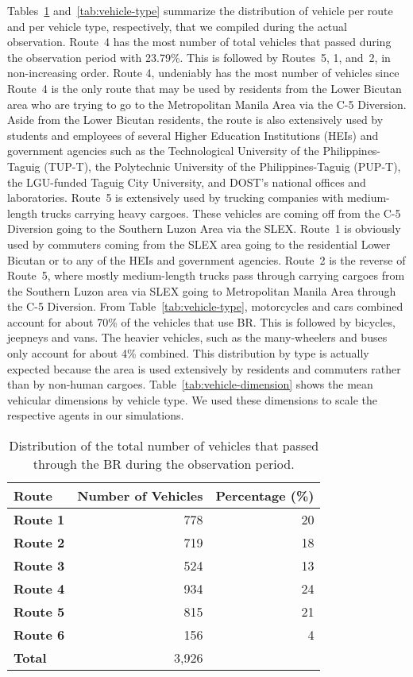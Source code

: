 \documentclass[preprint]{./acm_proc_article-sp}
\begin{document}
Tables~\ref{tab:current} and~\ref{tab:vehicle-type} summarize the distribution of vehicle per route and per vehicle type, respectively, that we compiled during the actual observation. Route~4 has the most number of total vehicles that passed during the observation period with 23.79\%. This is followed by Routes~5, 1, and~2, in non-increasing order. Route 4, undeniably has the most number of vehicles since Route~4 is the only route that may be used by residents from the Lower Bicutan area who are trying to go to the Metropolitan Manila Area via the C-5 Diversion. Aside from the Lower Bicutan residents, the route is also extensively used by students and employees of several Higher Education Institutions (HEIs) and government agencies such as the Technological University of the Philippines-Taguig (TUP-T), the Polytechnic University of the Philippines-Taguig (PUP-T), the LGU-funded Taguig City University, and DOST's national offices and laboratories. Route~5 is extensively used by trucking companies with medium-length trucks carrying heavy cargoes. These vehicles are coming off from the C-5 Diversion going to the Southern Luzon Area via the SLEX. Route~1 is obviously used by commuters coming from the SLEX area going to the residential Lower Bicutan or to any of the HEIs and government agencies. Route~2 is the reverse of Route~5, where mostly medium-length trucks pass through carrying cargoes from the Southern Luzon area via SLEX going to Metropolitan Manila Area through the C-5 Diversion. From Table~\ref{tab:vehicle-type}, motorcycles and cars combined account for about 70\% of the vehicles that use BR. This is followed by bicycles, jeepneys and vans. The heavier vehicles, such as the many-wheelers and buses only account for about 4\% combined. This distribution by type is actually expected because the area is used extensively by residents and commuters rather than by non-human cargoes. Table~\ref{tab:vehicle-dimension} shows the mean vehicular dimensions by vehicle type. We used these dimensions to scale the respective agents in our simulations.

\begin{table}[bth]
\caption{Distribution of the total number of vehicles that passed through the BR during the observation period.}\label{tab:current}
\centering\begin{tabular}{lrr}
\hline\hline
Route & Number of Vehicles & Percentage (\%) \\
\hline
{\bf Route 1} & 778 & 20 \\
{\bf Route 2} & 719 & 18 \\
{\bf Route 3} & 524 & 13 \\
{\bf Route 4} & 934 & 24 \\
{\bf Route 5} & 815 & 21 \\
{\bf Route 6} & 156 & 4 \\
\hline
{\bf Total} & 3,926 \\
\hline\hline
\end{tabular}
\end{table}
\end{document}
